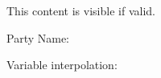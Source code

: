 \documentclass{article}
\begin{document}

  This content is visible if valid.

  Party Name: %

Variable interpolation: %


\makyesignmeta
\end{document}
